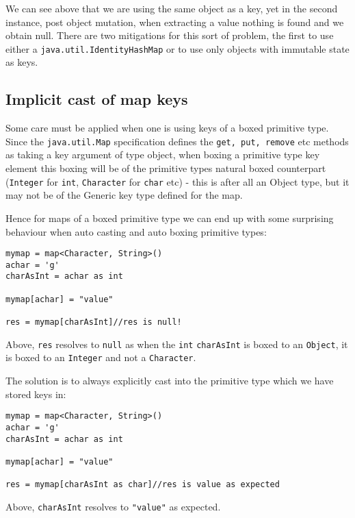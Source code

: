 \documentclass[conc-doc]{subfiles}
\begin{document}
We can see above that we are using the same object as a key, yet in the second instance, post object mutation, when extracting a value nothing is found and we obtain null. There are two mitigations for this sort of problem, the first to use either a \lstinline{java.util.IdentityHashMap} or to use only objects with immutable state as keys.

\subsection{Implicit cast of map keys}
Some care must be applied when one is using keys of a boxed primitive type. Since the \lstinline{java.util.Map} specification defines the \lstinline{get, put, remove} etc methods as taking a key argument of type object, when boxing a primitive type key element this boxing will be of the primitive types natural boxed counterpart (\lstinline{Integer} for \lstinline{int}, \lstinline{Character} for \lstinline{char} etc) - this is after all an Object type, but it may not be of the Generic key type defined for the map.

Hence for maps of a boxed primitive type we can end up with some surprising behaviour when auto casting and auto boxing primitive types:

\begin{lstlisting}
mymap = map<Character, String>()
achar = 'g'
charAsInt = achar as int

mymap[achar] = "value"

res = mymap[charAsInt]//res is null!
\end{lstlisting}


Above, \lstinline{res} resolves to \lstinline{null} as when the \lstinline{int} \lstinline{charAsInt} is boxed to an \lstinline{Object}, it is boxed to an \lstinline{Integer} and not a \lstinline{Character}.

The solution is to always explicitly cast into the primitive type which we have stored keys in:

\begin{lstlisting}
mymap = map<Character, String>()
achar = 'g'
charAsInt = achar as int

mymap[achar] = "value"

res = mymap[charAsInt as char]//res is value as expected
\end{lstlisting}

Above, \lstinline{charAsInt} resolves to \lstinline{"value"} as expected.
\end{document}
